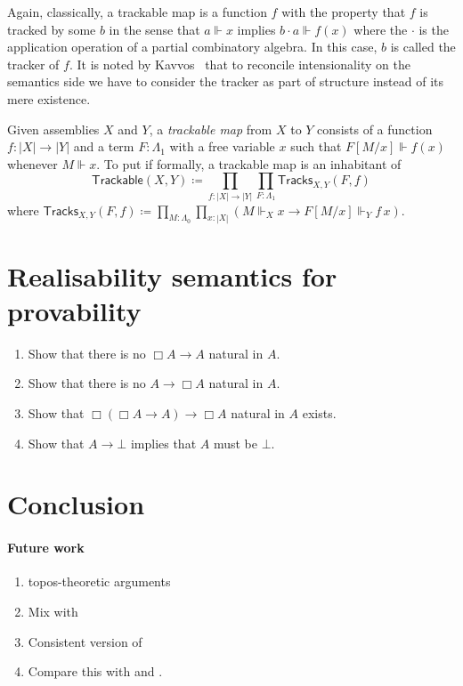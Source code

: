 \documentclass[a4paper,UKenglish,numberwithinsect,cleveref,thm-restate]{lipics-v2021}
\newcommand{\defeq}{\coloneqq}
\begin{document}
Again, classically, a trackable map is a function $f$ with the property that $f$ is tracked by some $b$ in the sense that $a \Vdash x$ implies $b \cdot a \Vdash f(x)$ where the $\cdot$ is the application operation of a partial combinatory algebra. In this case, $b$ is called the tracker of $f$.
It is noted by Kavvos~\cite{Kavvos2017b} that to reconcile intensionality on the semantics side we have to consider the tracker as part of structure instead of its mere existence.
\begin{definition}
  Given assemblies $X$ and $Y$, a \emph{trackable map} from $X$ to $Y$ consists of a function $f : |X| \to |Y|$ and a term $F : \Lambda_1$ with a free variable $x$ such that $F[M/x] \Vdash f(x)$ whenever $M \Vdash x$.
  To put if formally, a trackable map is an inhabitant of
  \[
    \mathsf{Trackable}(X, Y) \defeq \prod_{f : |X| \to |Y|} \prod_{F : \Lambda_1}
    \mathsf{Tracks}_{X, Y}(F, f)
  \]
  where 
    $\mathsf{Tracks}_{X, Y}(F, f) \defeq \prod_{M : \Lambda_0} \prod_{x : |X|}\left( M \Vdash_X x \to F[M/x] \Vdash_Y f\,x \right)$.
\end{definition}


\begin{proposition}
  
\end{proposition}
\section{Realisability semantics for provability}

\begin{enumerate}
  \item Show that there is no $\Box A \to A$ natural in $A$.
  \item Show that there is no $A \to \Box A$ natural in $A$.
  \item Show that $\Box (\Box A \to A) \to \Box A$ natural in $A$ exists.
  \item Show that $A \to \bot$ implies that $A$ must be $\bot$.
\end{enumerate}

\cite{Mogelberg2019a,Veltri2020}

\section{Conclusion}
\paragraph*{Future work}
\begin{enumerate}
  \item topos-theoretic arguments
  \item Mix with \cite{Kavvos2017b}
  \item Consistent version of \cite{Kavvos2017b}
  \item Compare this with \cite{Shamkanov2014} and \cite{Shamkanov2016a}.
\end{enumerate}
\cite{Davies2001b}
\end{document}
